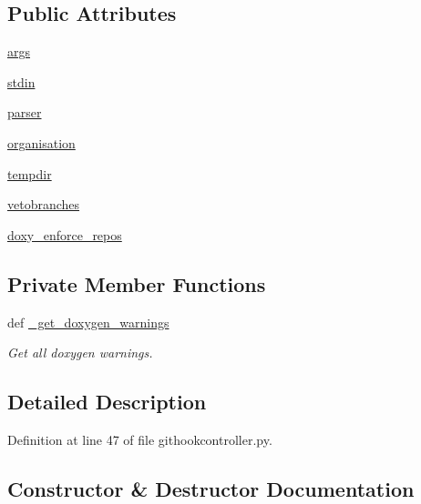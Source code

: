 \subsection*{Public Attributes}
\begin{DoxyCompactItemize}
\item 
\hyperlink{classgithookcontroller_1_1GitHookController_a86262238108e9a37e5b3ca47e4f9b94e}{args}
\item 
\hyperlink{classgithookcontroller_1_1GitHookController_a2979702282896092040b9e3adff073e5}{stdin}
\item 
\hyperlink{classgithookcontroller_1_1GitHookController_abb66a7d13f82d794351fc72184c92aa6}{parser}
\item 
\hyperlink{classgithookcontroller_1_1GitHookController_a0600f5f58184170fa103c486691cde5e}{organisation}
\item 
\hyperlink{classgithookcontroller_1_1GitHookController_a8ba9332f051b62f8be656967a1607b16}{tempdir}
\item 
\hyperlink{classgithookcontroller_1_1GitHookController_aef6dc3b539aa239e80317038abe866aa}{vetobranches}
\item 
\hyperlink{classgithookcontroller_1_1GitHookController_aa8e96fe61c7a24a30c5d4a2abcbd49dc}{doxy\-\_\-enforce\-\_\-repos}
\end{DoxyCompactItemize}
\subsection*{Private Member Functions}
\begin{DoxyCompactItemize}
\item 
def \hyperlink{classgithookcontroller_1_1GitHookController_ad141395de7add5599a17feef12309ef3}{\-\_\-get\-\_\-doxygen\-\_\-warnings}
\begin{DoxyCompactList}\small\item\em Get all doxygen warnings. \end{DoxyCompactList}\end{DoxyCompactItemize}


\subsection{Detailed Description}


Definition at line 47 of file githookcontroller.\-py.



\subsection{Constructor \& Destructor Documentation}
